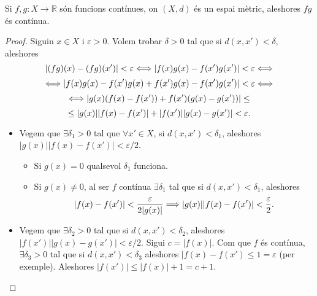 \documentclass[../main.tex]{subfiles}
\begin{document}
\begin{prop}
\label{prop:productedefuncions} Si $f,g:X\rightarrow \mathbb{R}$ són funcions contínues, on $(X,d)$ és un espai mètric, aleshores $fg$ és contínua.
\end{prop}
\begin{proof}
Siguin $x\in X$ i $\varepsilon >0$. Volem trobar $\delta>0$ tal que si $d(x,x')<\delta$, aleshores
\begin{equation}
    \notag
    |(fg)(x)-(fg)(x')|<\varepsilon \Longleftrightarrow |f(x)g(x)-f(x')g(x')|<\varepsilon \Longleftrightarrow
\end{equation}
\begin{equation}
    \notag
    \Longleftrightarrow|f(x)g(x)-f(x')g(x)+f(x')g(x)-f(x')g(x')| < \varepsilon \Longleftrightarrow
\end{equation}\begin{equation}
    \notag
    \Longleftrightarrow |g(x)(f(x)-f(x'))+f(x')(g(x)-g(x'))|\leq
\end{equation}
\begin{equation}
    \notag
    \leq  |g(x)||f(x)-f(x')|+|f(x')||g(x)-g(x')|<\varepsilon.
\end{equation}
\begin{itemize}
    \item Vegem que $\exists \delta_1>0$ tal que $\forall x'\in X$, si $d(x,x')<\delta_1$, aleshores $|g(x)||f(x)-f(x')|<\varepsilon/2$.
    \begin{itemize}
        \item Si $g(x) = 0$ qualsevol $\delta_1$ funciona.
        \item Si $g(x)\not=0$, al ser $f$ contínua $\exists\delta_1$ tal que si $d(x,x')<\delta_1$, aleshores
        \begin{equation}
            \notag
            |f(x)-f(x')|<\frac{\varepsilon}{2|g(x)|}\Longrightarrow |g(x)||f(x)-f(x')|<\frac{\varepsilon}{2}.
        \end{equation}
    \end{itemize}
    
    \item Vegem que $\exists \delta_2>0$ tal que si $d(x,x')<\delta_2$, aleshores $|f(x')||g(x)-g(x')|<\varepsilon/2$. Sigui $c = |f(x)|$. Com que $f$ és contínua, $\exists \delta_3>0$ tal que si $d(x,x')<\delta_3$ aleshores $|f(x)-f(x')\leq 1 = \varepsilon$ (per exemple). Aleshores $|f(x')|\leq |f(x)|+1 = c+1$.
    

\end{itemize}
\end{proof}
\end{document}
